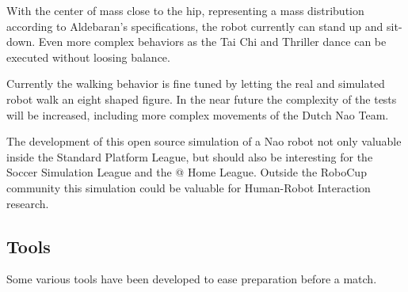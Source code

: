 \documentclass[a4paper]{article}
\begin{document}
With the center of mass close to the hip, representing a mass distribution according to Aldebaran's specifications, the robot currently can stand up and sit-down. Even more complex behaviors as the Tai Chi and Thriller dance can be executed without loosing balance.

Currently the walking behavior is fine tuned by letting the real and simulated robot walk an eight shaped figure. In the near future the complexity of the tests will be increased, including more complex movements of the Dutch Nao Team.

The development of this open source simulation of a Nao robot not only valuable inside the Standard Platform League, but should also be interesting for the Soccer Simulation League and the @ Home League. Outside the RoboCup community this simulation could be valuable for Human-Robot Interaction research.

\subsection{Tools}
Some various tools have been developed to ease preparation before a match. 
\end{document}
